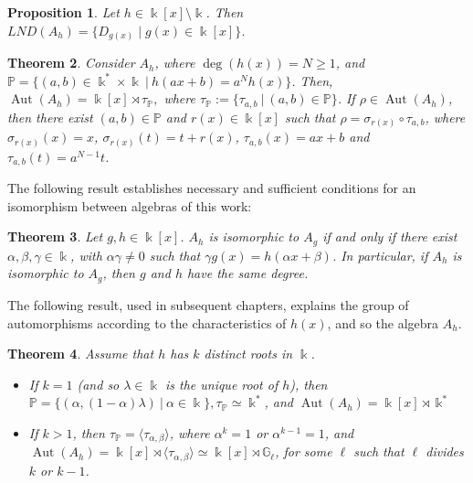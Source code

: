 \documentclass{article}
\numberwithin{equation}{section}\theoremstyle{plain}
\newtheorem{theorem}{Theorem}
\newtheorem{proposition}[theorem]{Proposition}
\DeclareMathOperator{\Aut}{Aut}
\begin{document}
\begin{proposition}\cite[Prop. 2]{ISF2021}\label{prop_localnilp}
Let $h \in \Bbbk[x] \setminus \Bbbk$.
Then  $LND(A_h)=\{D_{g(x)} \mid g(x) \in \Bbbk[x]\}$.
\end{proposition}

\begin{theorem} \label{cod_aut} \cite[Thm. 8.3]{BLO2015} Consider $A_h$, where $\deg(h(x))=N \geq 1$, and $\mathbb{P}=\{ (a,b)\in \Bbbk^*\times \Bbbk \ | \ h(ax+b)=a^Nh(x)\}$.
Then, $\Aut (A_h)=\Bbbk[x]\rtimes \tau_{\mathbb{P}},$ where $ \tau_{\mathbb{P}}:=\{\tau_{a,b} \ | \ (a,b)\in\mathbb{P}\}$.
If $\rho\in \Aut(A_h)$, then there exist $(a,b)\in \mathbb{P}$ and $r(x)\in \Bbbk[x]$ such that $\rho=\sigma_{r(x)}\circ\tau_{a,b}$, where
    $\sigma_{r(x)}(x)=x$, $\sigma_{r(x)}(t)=t+r(x)$, $\tau_{a,b}(x) = ax+b$ and $\tau_{a,b}(t) = a^{N-1}t$.
\end{theorem}

\medbreak

The following result establishes necessary and sufficient conditions for an isomorphism between algebras of this work:

\begin{theorem}\label{teo_isoA_h}\cite[Thm. 8.2]{BLO2015}
Let $g,h \in \Bbbk[x]$.
$A_h$ is isomorphic to $A_g$ if and only if there exist $\alpha, \beta, \gamma \in \Bbbk$, with $\alpha \gamma \neq 0$ such that $\gamma g(x) = h(\alpha x + \beta)$.
    In particular, if $A_h$ is isomorphic to $A_g$, then $g$ and $h$ have the same degree.
 \end{theorem}



The following result, used in subsequent chapters, explains the group of automorphisms according to the characteristics of $h(x)$, and so the algebra $A_h$.

\begin{theorem}\cite[Thm. 8.6]{BLO2015}\label{8_6_Samuel}
Assume that $h$ has $k$ distinct roots in $\Bbbk$.
\begin{itemize}
    \item[i)] If $k=1$ (and so $\lambda \in \Bbbk$ is the unique root of $h$), then $\mathbb{P} = \{(\alpha, (1-\alpha) \lambda) \ | \ \alpha \in \Bbbk \}, \tau_{\mathbb{P}} \simeq \Bbbk^\ast$, and $\Aut(A_h) = \Bbbk[x] \rtimes \Bbbk^\ast$
    \item[ii)] If $k > 1$, then $\tau_{\mathbb{P}} = \langle \tau_{\alpha, \beta} \rangle$, where $\alpha^k=1$ or $\alpha^{k-1}=1$, and $\Aut(A_h) = \Bbbk[x] \rtimes \langle \tau_{\alpha, \beta} \rangle \simeq \Bbbk[x] \rtimes  \mathbb{G}_\ell$, for some $\ell$ such that $\ell$ divides $k$ or $k-1$.
\end{itemize}
\end{theorem}
\end{document}
